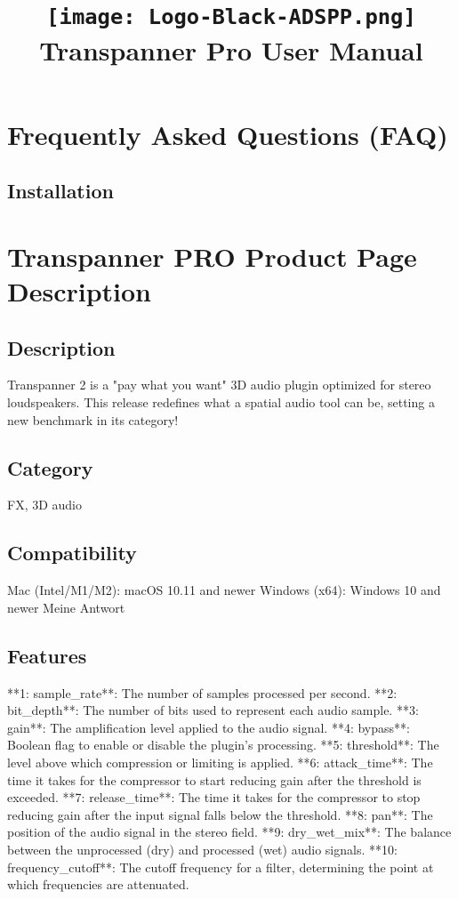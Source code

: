 \documentclass[8pt]{article}
\title{\vspace{-5em}%
\begin{center}%
\texttt{[image: Logo-Black-ADSPP.png]}\\[1em]%
\huge\textbf{Transpanner Pro User Manual}%
\end{center}%
\vspace{-1.5em}}
\date{}
\begin{document}
\section*{Frequently Asked Questions (FAQ)}

\subsection*{Installation}

    \section*{Transpanner PRO  Product Page Description}

    \subsection*{Description}
    Transpanner 2 is a "pay what you want" 3D audio plugin optimized for stereo loudspeakers. This release redefines what a spatial audio tool can be, setting a new benchmark in its category!

    \subsection*{Category}
    FX, 3D audio

    \subsection*{Compatibility}
    Mac (Intel/M1/M2): macOS 10.11 and newer
Windows (x64): Windows 10 and newer
Meine Antwort


    \subsection*{Features}
    **1: sample_rate**: The number of samples processed per second.
**2: bit_depth**: The number of bits used to represent each audio sample.
**3: gain**: The amplification level applied to the audio signal.
**4: bypass**: Boolean flag to enable or disable the plugin’s processing.
**5: threshold**: The level above which compression or limiting is applied.
**6: attack_time**: The time it takes for the compressor to start reducing gain after the threshold is exceeded.
**7: release_time**: The time it takes for the compressor to stop reducing gain after the input signal falls below the threshold.
**8: pan**: The position of the audio signal in the stereo field.
**9: dry_wet_mix**: The balance between the unprocessed (dry) and processed (wet) audio signals.
**10: frequency_cutoff**: The cutoff frequency for a filter, determining the point at which frequencies are attenuated.
\end{document}
